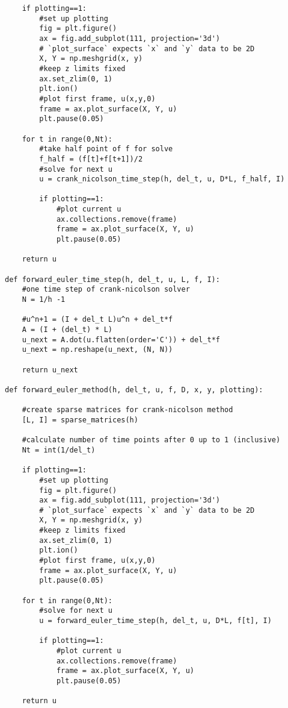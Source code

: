 \documentclass[12pt]{article}
\begin{document}
\begin{verbatim}
    if plotting==1:
        #set up plotting
        fig = plt.figure()
        ax = fig.add_subplot(111, projection='3d')
        # `plot_surface` expects `x` and `y` data to be 2D
        X, Y = np.meshgrid(x, y)  
        #keep z limits fixed
        ax.set_zlim(0, 1)
        plt.ion()
        #plot first frame, u(x,y,0)
        frame = ax.plot_surface(X, Y, u)
        plt.pause(0.05)

    for t in range(0,Nt):
        #take half point of f for solve
        f_half = (f[t]+f[t+1])/2
        #solve for next u
        u = crank_nicolson_time_step(h, del_t, u, D*L, f_half, I)
        
        if plotting==1:
            #plot current u
            ax.collections.remove(frame)
            frame = ax.plot_surface(X, Y, u)
            plt.pause(0.05)

    return u

def forward_euler_time_step(h, del_t, u, L, f, I):
    #one time step of crank-nicolson solver
    N = 1/h -1

    #u^n+1 = (I + del_t L)u^n + del_t*f
    A = (I + (del_t) * L)
    u_next = A.dot(u.flatten(order='C')) + del_t*f
    u_next = np.reshape(u_next, (N, N))

    return u_next

def forward_euler_method(h, del_t, u, f, D, x, y, plotting):

    #create sparse matrices for crank-nicolson method
    [L, I] = sparse_matrices(h)

    #calculate number of time points after 0 up to 1 (inclusive)
    Nt = int(1/del_t)

    if plotting==1:
        #set up plotting
        fig = plt.figure()
        ax = fig.add_subplot(111, projection='3d')
        # `plot_surface` expects `x` and `y` data to be 2D
        X, Y = np.meshgrid(x, y)  
        #keep z limits fixed
        ax.set_zlim(0, 1)
        plt.ion()
        #plot first frame, u(x,y,0)
        frame = ax.plot_surface(X, Y, u)
        plt.pause(0.05)

    for t in range(0,Nt):
        #solve for next u
        u = forward_euler_time_step(h, del_t, u, D*L, f[t], I)
        
        if plotting==1:
            #plot current u
            ax.collections.remove(frame)
            frame = ax.plot_surface(X, Y, u)
            plt.pause(0.05)

    return u
\end{verbatim}
\end{document}
